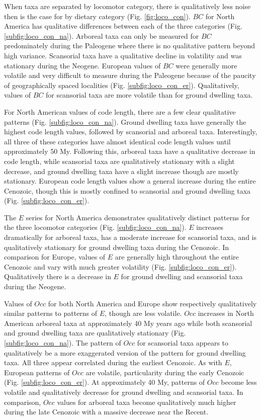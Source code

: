 \documentclass[12pt,letterpaper]{article}
\begin{document}
When taxa are separated by locomotor category, there is qualitatively less noise then is the case for by dietary category (Fig. \ref{fig:loco_con}). \(BC\) for North America has qualitative differences between each of the three categories (Fig. \ref{subfig:loco_con_na}). Arboreal taxa can only be measured for \(BC\) predominately during the Paleogene where there is no qualitative pattern beyond high variance. Scansorial taxa have a qualitative decline in volatility and was stationary during the Neogene. European values of \(BC\) were generally more volatile and very difficult to measure during the Paleogene because of the paucity of geographically spaced localities (Fig. \ref{subfig:loco_con_er}). Qualitatively, values of \(BC\) for scansorial taxa are more volatile than for ground dwelling taxa. 

For North American values of code length, there are a few clear qualitative patterns (Fig. \ref{subfig:loco_con_na}). Ground dwelling taxa have generally the highest code length values, followed by scansorial and arboreal taxa. Interestingly, all three of these categories have almost identical code length values until approximately 50 My. Following this, arboreal taxa have a qualitative decrease in code length, while scansorial taxa are qualitatively stationary with a slight decrease, and ground dwelling taxa have a slight increase though are mostly stationary. European code length values show a general increase during the entire Cenozoic, though this is mostly confined to scansorial and ground dwelling taxa (Fig. \ref{subfig:loco_con_er}).

The \(E\) series for North America demonstrates qualitatively distinct patterns for the three locomotor categories (Fig. \ref{subfig:loco_con_na}). \(E\) increases dramatically for arboreal taxa, has a moderate increase for scansorial taxa, and is qualitatively stationary for ground dwelling taxa during the Cenozoic. In comparison for Europe, values of \(E\) are generally high throughout the entire Cenozoic and vary with much greater volatility (Fig. \ref{subfig:loco_con_er}). Qualitatively there is a decrease in \(E\) for ground dwelling and scansorial taxa during the Neogene.

Values of \(Occ\) for both North America and Europe show respectively qualitatively similar patterns to patterns of \(E\), though are less volatile. \(Occ\) increases in North American arboreal taxa at approximately 40 My years ago while both scansorial and ground dwelling taxa are qualitatively stationary (Fig. \ref{subfig:loco_con_na}). The pattern of \(Occ\) for scansorial taxa appears to qualitatively be a more exaggerated version of the pattern for ground dwelling taxa. All three appear correlated during the earliest Cenozoic. As with \(E\), European patterns of \(Occ\) are volatile, particularity during the early Cenozoic (Fig. \ref{subfig:loco_con_er}). At approximately 40 My, patterns of \(Occ\) become less volatile and qualitatively decrease for ground dwelling and scansorial taxa. In comparison, \(Occ\) values for arboreal taxa become qualitatively much higher during the late Cenozoic with a massive decrease near the Recent.
\end{document}
